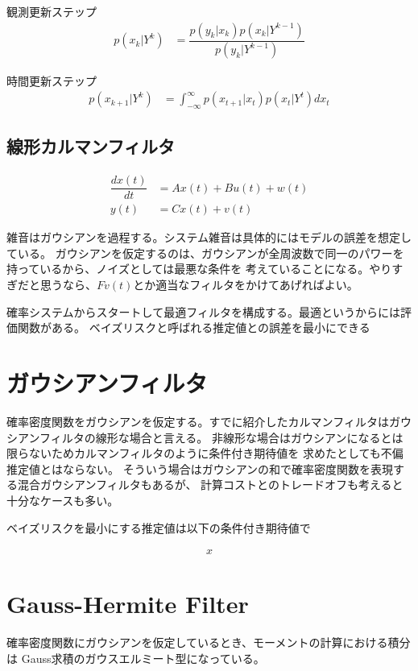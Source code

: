 観測更新ステップ
\begin{align}
p(x_k|Y^k)
&=
\dfrac{p(y_k|x_k)p(x_k|Y^{k-1})}{p(y_k|Y^{k-1})}
\end{align}



時間更新ステップ
\begin{align}
p(x_{k+1}|Y^k)
&=
\int_{-\infty}^\infty
p(x_{t+1}|x_t) p(x_t|Y^t)dx_t
\end{align}







\subsection{線形カルマンフィルタ}

\begin{align}
\dfrac{dx(t)}{dt}&=Ax(t)+Bu(t)+w(t) 			\\
y(t)&=Cx(t) + v(t)
\end{align}

雑音はガウシアンを過程する。システム雑音は具体的にはモデルの誤差を想定している。
ガウシアンを仮定するのは、ガウシアンが全周波数で同一のパワーを持っているから、ノイズとしては最悪な条件を
考えていることになる。やりすぎだと思うなら、$Fv(t)$とか適当なフィルタをかけてあげればよい。

確率システムからスタートして最適フィルタを構成する。最適というからには評価関数がある。
ベイズリスクと呼ばれる推定値との誤差を最小にできる



\section{ガウシアンフィルタ}
確率密度関数をガウシアンを仮定する。すでに紹介したカルマンフィルタはガウシアンフィルタの線形な場合と言える。
非線形な場合はガウシアンになるとは限らないためカルマンフィルタのように条件付き期待値を
求めたとしても不偏推定値とはならない。
そういう場合はガウシアンの和で確率密度関数を表現する混合ガウシアンフィルタもあるが、
計算コストとのトレードオフも考えると十分なケースも多い。

ベイズリスクを最小にする推定値は以下の条件付き期待値で

\begin{align}
x
\end{align}

\section{Gauss-Hermite Filter}
確率密度関数にガウシアンを仮定しているとき、モーメントの計算における積分は
Gauss求積のガウスエルミート型になっている。



